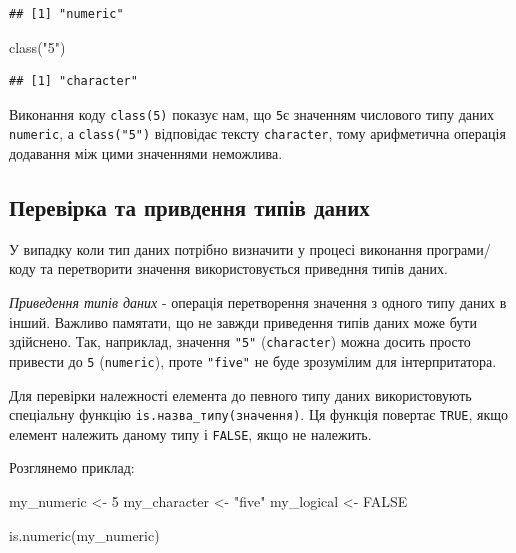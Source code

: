 \documentclass[
]{book}
\newenvironment{Shaded}{\begin{snugshade}}{\end{snugshade}}
\newcommand{\ConstantTok}[1]{\textcolor[rgb]{0.00,0.00,0.00}{#1}}
\newcommand{\DecValTok}[1]{\textcolor[rgb]{0.00,0.00,0.81}{#1}}
\newcommand{\FunctionTok}[1]{\textcolor[rgb]{0.00,0.00,0.00}{#1}}
\newcommand{\NormalTok}[1]{#1}
\newcommand{\OtherTok}[1]{\textcolor[rgb]{0.56,0.35,0.01}{#1}}
\newcommand{\StringTok}[1]{\textcolor[rgb]{0.31,0.60,0.02}{#1}}
\begin{document}
\begin{verbatim}
## [1] "numeric"
\end{verbatim}

\begin{Shaded}
\begin{Highlighting}[]
\FunctionTok{class}\NormalTok{(}\StringTok{"5"}\NormalTok{)}
\end{Highlighting}
\end{Shaded}

\begin{verbatim}
## [1] "character"
\end{verbatim}

Виконання коду \texttt{class(5)} показує нам, що \texttt{5}є значенням числового типу даних \texttt{numeric}, а \texttt{class("5")} відповідає тексту \texttt{character}, тому арифметична операція додавання між цими значеннями неможлива.

\hypertarget{chapter222}{%
\subsection{Перевірка та привдення типів даних}\label{chapter222}}

У випадку коли тип даних потрібно визначити у процесі виконання програми/коду та перетворити значення використовується приведння типів даних.

\emph{Приведення типів даних} - операція перетворення значення з одного типу даних в інший. Важливо памятати, що не завжди приведення типів даних може бути здійснено. Так, наприклад, значення \texttt{"5"} (\texttt{character}) можна досить просто привести до \texttt{5} (\texttt{numeric}), проте \texttt{"five"} не буде зрозумілим для інтерпритатора.

Для перевірки належності елемента до певного типу даних використовують спеціальну функцію \texttt{is.назва\_типу(значення)}. Ця функція повертає \texttt{TRUE}, якщо елемент належить даному типу і \texttt{FALSE}, якщо не належить.

Розглянемо приклад:

\begin{Shaded}
\begin{Highlighting}[]
\NormalTok{my\_numeric }\OtherTok{\textless{}{-}} \DecValTok{5}
\NormalTok{my\_character }\OtherTok{\textless{}{-}} \StringTok{"five"}
\NormalTok{my\_logical }\OtherTok{\textless{}{-}} \ConstantTok{FALSE}

\FunctionTok{is.numeric}\NormalTok{(my\_numeric)}
\end{Highlighting}
\end{Shaded}
\end{document}
